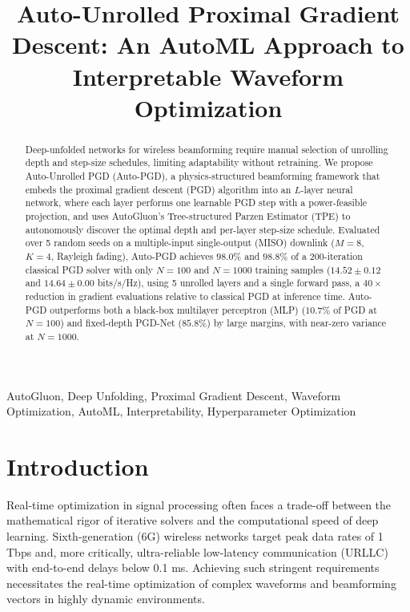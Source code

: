 \documentclass[conference,11pt]{IEEEtran}
\begin{document}
\setlength{\columnsep}{0.25in}
\fontsize{11pt}{13.2pt}\selectfont

\title{Auto-Unrolled Proximal Gradient Descent: An AutoML Approach to Interpretable Waveform Optimization}

\author{
}

\maketitle

\begin{abstract}
Deep-unfolded networks for wireless beamforming require manual selection of unrolling depth and step-size schedules, limiting adaptability without retraining. We propose Auto-Unrolled PGD (Auto-PGD), a physics-structured beamforming framework that embeds the proximal gradient descent (PGD) algorithm into an $L$-layer neural network, where each layer performs one learnable PGD step with a power-feasible projection, and uses AutoGluon's Tree-structured Parzen Estimator (TPE) to autonomously discover the optimal depth and per-layer step-size schedule. Evaluated over 5 random seeds on a multiple-input single-output (MISO) downlink ($M{=}8$, $K{=}4$, Rayleigh fading), Auto-PGD achieves $98.0\%$ and $98.8\%$ of a 200-iteration classical PGD solver with only $N{=}100$ and $N{=}1000$ training samples ($14.52{\pm}0.12$ and $14.64{\pm}0.00$ bits/s/Hz), using 5 unrolled layers and a single forward pass, a $40{\times}$ reduction in gradient evaluations relative to classical PGD at inference time. Auto-PGD outperforms both a black-box multilayer perceptron (MLP) ($10.7\%$ of PGD at $N{=}100$) and fixed-depth PGD-Net ($85.8\%$) by large margins, with near-zero variance at $N{=}1000$. 
\end{abstract}

\begin{IEEEkeywords}
AutoGluon, Deep Unfolding, Proximal Gradient Descent, Waveform Optimization, AutoML, Interpretability, Hyperparameter Optimization
\end{IEEEkeywords}

\section{Introduction}
Real-time optimization in signal processing often faces a trade-off between the mathematical rigor of iterative solvers and the computational speed of deep learning. Sixth-generation (6G) wireless networks target peak data rates of 1 Tbps and, more critically, ultra-reliable low-latency communication (URLLC) with end-to-end delays below 0.1 ms. Achieving such stringent requirements necessitates the real-time optimization of complex waveforms and beamforming vectors in highly dynamic environments.
\end{document}
